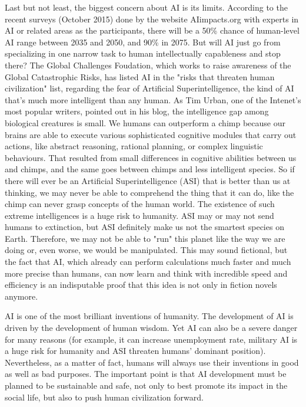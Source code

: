 \documentclass[12pt,a4paper]{article}
\begin{document}
Last but not least, the biggest concern about AI is its limits. According to the recent surveys (October 2015) done by the website AIimpacts.org with experts in AI or related areas as the participants, there will be a 50\% chance of human-level AI range between 2035 and 2050, and 90\% in 2075. But will AI just go from specializing in one narrow task to human intellectually capableness and stop there? The Global Challenges Foudation, which works to raise awareness of the Global Catastrophic Risks, has listed AI in the "risks that threaten human civilization" list, regarding the fear of Artificial Superintelligence, the kind of AI that's much more intelligent than any human. As Tim Urban, one of the Intenet's most popular writers, pointed out in his blog, the intelligence gap among biological creatures is small. We humans can outperform a chimp because our brains are able to execute various sophisticated cognitive modules that carry out actions, like abstract reasoning, rational planning, or complex linguistic behaviours. That resulted from small differences in cognitive abilities between us and chimps, and the same goes between chimps and less intelligent species. So if there will ever be an Artificial Superintelligence (ASI) that is better than us at thinking, we may never be able to comprehend the thing that it can do, like the chimp can never grasp concepts of the human world. The existence of such extreme intelligences is a huge risk to humanity. ASI may or may not send humans to extinction, but ASI definitely make us not the smartest species on Earth. Therefore, we may not be able to "run" this planet like the way we are doing or, even worse, we would be manipulated. This may sound fictional, but the fact that AI, which already can perform calculations much faster and much more precise than humans, can now learn and think with incredible speed and efficiency is an indisputable proof that this idea is not only in fiction novels anymore.

AI is one of the most brilliant inventions of humanity. The development of AI is driven by the development of human wisdom. Yet AI can also be a severe danger for many reasons (for example, it can increase unemployment rate, military AI is a huge risk for humanity and ASI threaten humans' dominant position). Nevertheless, as a matter of fact, humans will always use their inventions in good as well as bad purposes. The important point is that AI development must be planned to be sustainable and safe, not only to best promote its impact in the social life, but also to push human civilization forward.
\end{document}
